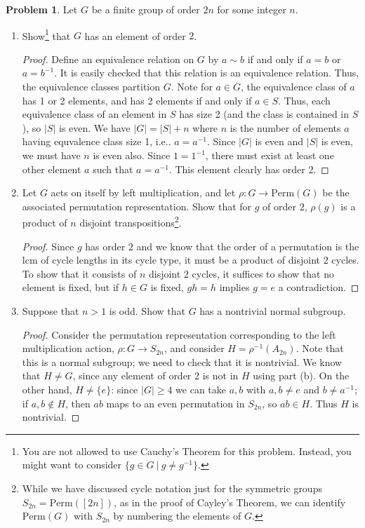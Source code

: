 \documentclass[11pt]{article}
\theoremstyle{definition}
\newtheorem{problem}{Problem}
\begin{document}
\begin{problem} Let $G$ be a finite group of order $2n$ for some integer $n$.
\begin{enumerate}[(5.1)]
\item Show\footnote{You are not allowed to use Cauchy's Theorem for this problem. Instead, you might want to consider ${\{g\in G \ | \ g \neq g^{-1}\}}$.} that $G$ has an element of order $2$.

\begin{proof}
Define an equivalence relation on $G$ by $a\sim b$ if and only if $a=b$ or $a=b^{-1}$.  It is easily checked that this relation is an equivalence relation.  Thus, the equivalence classes partition $G$.  Note for $a\in G$, the equivalence class of $a$ has 1 or 2 elements, and has 2 elements if and only if $a\in S$.  Thus, each equivalence class of an element in $S$ has size 2 (and the class is contained in $S$), so $|S|$ is even.  We have $|G|=|S|+n$ where $n$ is the number of elements $a$ having equvalence class size 1, i.e.. $a=a^{-1}$.  Since $|G|$ is even and $|S|$ is even, we must have $n$ is even also.  Since $1=1^{-1}$, there must exist at least one other element $a$ such that $a=a^{-1}$.
This element clearly has order 2.
\end{proof}

\item Let $G$ acts on itself by left multiplication, and let $\rho:G \to \mathrm{Perm}(G)$ be the associated permutation representation. Show that for $g$ of order $2$, $\rho(g)$ is a product of $n$ disjoint transpositions\footnote{While we have discussed cycle notation just for the symmetric groups $S_{2n} = \mathrm{Perm}([2n])$, as in the proof of Cayley's Theorem, we can identify $\mathrm{Perm}(G)$ with $S_{2n}$ by numbering the elements of $G$.}.

\begin{proof}
Since $g$ has order $2$ and we know that the order of a permutation is the lcm of cycle lengths in its cycle type, it must be a product of disjoint $2$ cycles. To show that it consists of $n$ disjoint $2$ cycles, it suffices to show that no element is fixed, but if $h\in G$ is fixed, $gh=h$ implies $g=e$ a contradiction.
\end{proof}

\item Suppose that $n>1$ is odd. Show that $G$ has a nontrivial normal subgroup.

\begin{proof}
Consider the permutation representation corresponding to the left multiplication action, $\rho:G\to S_{2n}$, and consider $H=\rho^{-1}(A_{2n})$. Note that this is a normal subgroup; we need to check that it is nontrivial. We know that $H\neq G$, since any element of order 2 is not in $H$ using part (b). On the other hand, $H\neq \{e\}$: since $|G|\geq 4$ we can take $a,b$ with $a,b\neq e$ and $b\neq a^{-1}$; if $a,b\notin H$, then $ab$ maps to an even permutation in $S_{2n}$, so $ab\in H$. Thus $H$ is nontrivial.
\end{proof}
\end{enumerate}

\end{problem}
\end{document}
